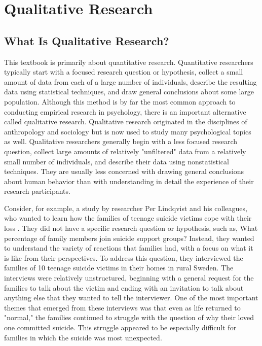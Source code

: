 \newpage
\section{Qualitative Research}
  


\subsection{What Is Qualitative Research?}

This textbook is primarily about quantitative research. Quantitative researchers typically start with a focused research question or hypothesis, collect a small amount of data from each of a large number of individuals, describe the resulting data using statistical techniques, and draw general conclusions about some large population. Although this method is by far the most common approach to conducting empirical research in psychology, there is an important alternative called qualitative research. Qualitative research originated in the disciplines of anthropology and sociology but is now used to study many psychological topics as well. Qualitative researchers generally begin with a less focused research question, collect large amounts of relatively "unfiltered" data from a relatively small number of individuals, and describe their data using nonstatistical techniques. They are usually less concerned with drawing general conclusions about human behavior than with understanding in detail the experience of their research participants.

Consider, for example, a study by researcher Per Lindqvist and his colleagues, who wanted to learn how the families of teenage suicide victims cope with their loss \citep{lindqvist_aftermath_2008}. They did not have a specific research question or hypothesis, such as, What percentage of family members join suicide support groups? Instead, they wanted to understand the variety of reactions that families had, with a focus on what it is like from their perspectives. To address this question, they interviewed the families of 10 teenage suicide victims in their homes in rural Sweden. The interviews were relatively unstructured, beginning with a general request for the families to talk about the victim and ending with an invitation to talk about anything else that they wanted to tell the interviewer. One of the most important themes that emerged from these interviews was that even as life returned to "normal," the families continued to struggle with the question of why their loved one committed suicide. This struggle appeared to be especially difficult for families in which the suicide was most unexpected.

